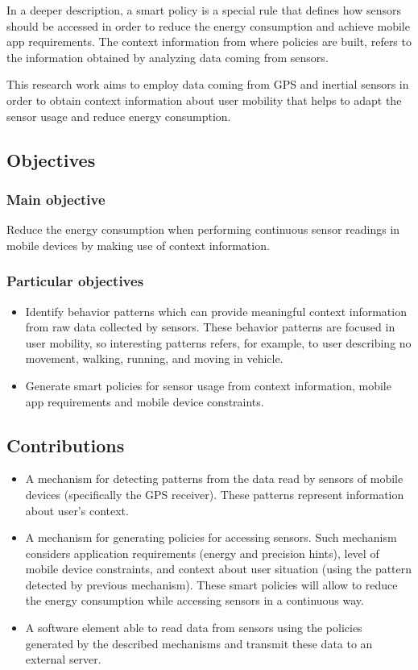 In a deeper description, a smart policy is a special rule that defines how sensors should be accessed in order to reduce the energy consumption and achieve mobile app requirements. The context information from where policies are built, refers to the information obtained by analyzing data coming from sensors.

This research work aims to employ data coming from GPS and inertial sensors in order to obtain context information about user mobility that helps to adapt the sensor usage and reduce energy consumption.

\subsection{Objectives} 
\label{sub:objectives}

\subsubsection{Main objective}
\label{ssub:main_objective}
Reduce the energy consumption when performing continuous sensor readings in mobile devices by making use of context information. 

\subsubsection{Particular objectives} 
\label{ssub:particular_objectives}
\begin{itemize}
  \item {Identify behavior patterns which can provide meaningful context information from raw data collected by sensors. These behavior patterns are focused in user mobility, so interesting patterns refers, for example, to user describing no movement, walking, running, and moving in vehicle}.
  \item {Generate smart policies for sensor usage from context information, mobile app requirements and mobile device constraints}.
\end{itemize}


\subsection{Contributions} 
\label{sub:contributions}

\begin{itemize}
  \item A mechanism for detecting patterns from the data read by sensors of mobile devices (specifically the GPS receiver).
  These patterns represent information about user's context.
  \item A mechanism for generating policies for accessing sensors.
        Such mechanism considers application requirements (energy and precision hints), level of mobile device constraints, and context about user situation (using the pattern detected by previous mechanism).
        These smart policies will allow to reduce the energy consumption while accessing sensors in a continuous way.
  \item A software element able to read data from sensors using the policies generated by the described mechanisms and transmit these data to an external server.
\end{itemize}